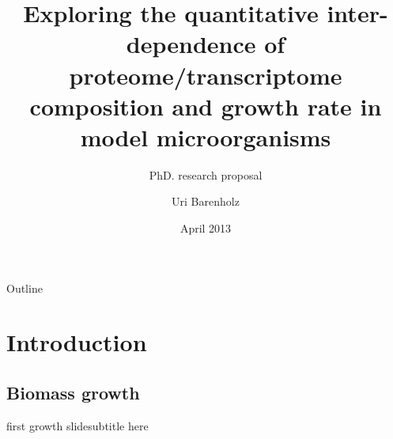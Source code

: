 \documentclass{beamer}
\title{Exploring the quantitative inter-dependence of proteome/transcriptome composition and growth rate in model microorganisms}
\subtitle{PhD. research proposal}
\author{Uri Barenholz}
\institute[The Weizmann Institute of Science]
{
        \inst{1}
        Department of Plant sciences
}
\date{April 2013}
\begin{document}
\begin{frame}
    \titlepage
\end{frame}
\begin{frame}{Outline}
    \tableofcontents
\end{frame}

\section{Introduction}
\subsection{Biomass growth}
\begin{frame}{first growth slide}{subtitle here}
\end{frame}
\end{document}
